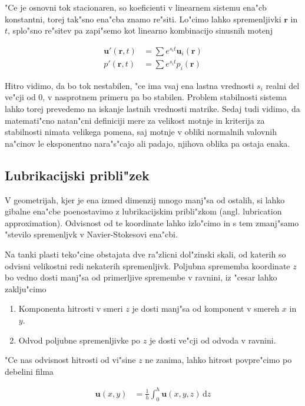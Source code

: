 \documentclass[a4paper,10pt]{article}
\renewcommand{\vec}{\mathbf}
\newcommand{\dd}{\,\mathrm{d}}
\newcommand{\rt}{(\vec r, t)}
\begin{document}
"Ce je osnovni tok stacionaren, so koeficienti v linearnem sistemu ena"cb konstantni, torej tak"sno ena"cba znamo re"siti. Lo"cimo lahko spremenljivki $\vec r$ in $t$, splo"sno re"sitev pa zapi"semo kot linearno kombinacijo sinusnih motenj

\begin{align}
 \vec u'\rt &= \sum e^{s_i t} \vec u_i(\vec r) \\
 p'\rt &= \sum e^{s_i t} p_i(\vec r)
\end{align}

Hitro vidimo, da bo tok nestabilen, "ce ima vsaj ena lastna vrednosti $s_i$ realni del ve"cji od 0, v nasprotnem primeru pa bo stabilen. Problem stabilnosti sistema lahko torej prevedemo na iskanje lastnih vrednosti matrike. Sedaj tudi vidimo, da matemati"cno natan"cni definiciji mere za velikost motnje in kriterija za stabilnosti nimata velikega pomena, saj motnje v obliki normalnih valovnih na"cinov le eksponentno nara"s"cajo ali padajo, njihova oblika pa ostaja enaka. 

\subsection{Lubrikacijski pribli"zek}

V geometrijah, kjer je ena izmed dimenzij mnogo manj"sa od ostalih, si lahko gibalne ena"cbe poenostavimo z lubrikacijskim pribli"zkom (angl. lubrication approximation). Odvisnost od te koordinate lahko izlo"cimo in s tem zmanj"samo "stevilo spremenljvk v Navier-Stokesovi ena"cbi. 

Na tanki plasti teko"cine obstajata dve ra"zlicni dol"zinski skali, od katerih so odvisni velikostni redi nekaterih spremenljivk. Poljubna sprememba koordinate $z$ bo vedno dosti manj"sa od primerljive spremembe v ravnini, iz "cesar lahko zaklju"cimo 

\begin{enumerate}
  \item Komponenta hitrosti v smeri $z$ je dosti manj"sa od komponent v smereh $x$ in $y$. 
  \item Odvod poljubne spremenljivke po $z$ je dosti ve"cji od odvoda v ravnini. 
\end{enumerate}

"Ce nas odvisnost hitrosti od vi"sine $z$ ne zanima, lahko hitrost povpre"cimo po debelini filma

\begin{align}
 \vec u(x,y) &=  \frac{1}{h}\int_0^h \vec u(x,y,z)\dd z
\end{align}
\end{document}
